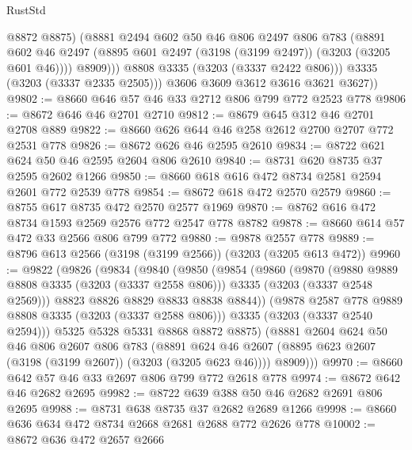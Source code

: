 \begin{lexlean}{RustStd}
\begin{coremodule}
{\begin{coremodule}
{{{{{{{{{{{{{{{                  @8872
                  @8875)
                (@8881
                  @2494
                  @602
                  @50
                  @46
                  @806
                  @2497
                  @806
                  @783
                  (@8891
                    @602
                    @46
                    @2497
                    (@8895 @601 @2497 (@3198 (@3199 @2497)) (@3203 (@3205 @601 @46))))
                  @8909)))
            @8808
            @3335
            (@3203 (@3337 @2422 @806)))
          @3335
          (@3203 (@3337 @2335 @2505)))
        @3606
        @3609
        @3612
        @3616
        @3621
        @3627))
@9802 := @8660 @646 @57 @46 @33 @2712 @806 @799 @772 @2523 @778
@9806 := @8672 @646 @46 @2701 @2710
@9812 := @8679 @645 @312 @46 @2701 @2708 @889
@9822 := @8660 @626 @644 @46 @258 @2612 @2700 @2707 @772 @2531 @778
@9826 := @8672 @626 @46 @2595 @2610
@9834 := @8722 @621 @624 @50 @46 @2595 @2604 @806 @2610
@9840 := @8731 @620 @8735 @37 @2595 @2602 @1266
@9850 := @8660 @618 @616 @472 @8734 @2581 @2594 @2601 @772 @2539 @778
@9854 := @8672 @618 @472 @2570 @2579
@9860 := @8755 @617 @8735 @472 @2570 @2577 @1969
@9870 := @8762 @616 @472 @8734 @1593 @2569 @2576 @772 @2547 @778 @8782
@9878 := @8660 @614 @57 @472 @33 @2566 @806 @799 @772
@9880 := @9878 @2557 @778
@9889 := @8796 @613 @2566 (@3198 (@3199 @2566)) (@3203 (@3205 @613 @472))
@9960 := @9822
    (@9826
      (@9834
        (@9840
          (@9850
            (@9854
              (@9860
                (@9870
                  (@9880 @9889 @8808 @3335 (@3203 (@3337 @2558 @806)))
                  @3335
                  (@3203 (@3337 @2548 @2569)))
                @8823
                @8826
                @8829
                @8833
                @8838
                @8844))
            (@9878 @2587 @778 @9889 @8808 @3335 (@3203 (@3337 @2588 @806)))
            @3335
            (@3203 (@3337 @2540 @2594)))
          @5325
          @5328
          @5331
          @8868
          @8872
          @8875)
        (@8881
          @2604
          @624
          @50
          @46
          @806
          @2607
          @806
          @783
          (@8891 @624 @46 @2607 (@8895 @623 @2607 (@3198 (@3199 @2607)) (@3203 (@3205 @623 @46))))
          @8909)))
@9970 := @8660 @642 @57 @46 @33 @2697 @806 @799 @772 @2618 @778
@9974 := @8672 @642 @46 @2682 @2695
@9982 := @8722 @639 @388 @50 @46 @2682 @2691 @806 @2695
@9988 := @8731 @638 @8735 @37 @2682 @2689 @1266
@9998 := @8660 @636 @634 @472 @8734 @2668 @2681 @2688 @772 @2626 @778
@10002 := @8672 @636 @472 @2657 @2666
}}}}}}}}}}}}}}}
\end{coremodule}}
\end{coremodule}
\end{lexlean}
